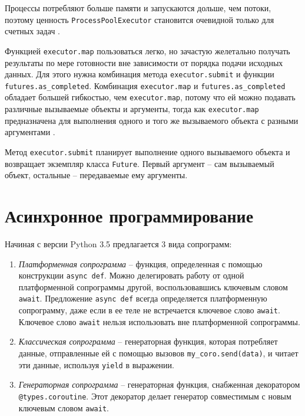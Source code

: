 \documentclass[%
	11pt,
	a4paper,
	utf8,
		]{article}
\begin{document}
Процессы потребляют больше памяти и запускаются дольше, чем потоки, поэтому ценность \verb|ProcessPoolExecutor| становится очевидной только для счетных задач \cite[]{ramalho:python-2022}.

Функцией \verb*|executor.map| пользоваться легко, но зачастую желетально получать результаты по мере готовности вне зависимости от порядка подачи исходных данных. Для этого нужна комбинация метода \verb|executor.submit| и функции \verb*|futures.as_completed|. Комбинация \verb|executor.map| и \verb*|futures.as_completed| обладает большей гибкостью, чем \verb|executor.map|, потому что ей можно подавать различные вызываемые объекты и аргументы, тогда как \verb*|executor.map| предназначена для выполнения одного и того же вызываемого объекта с разными аргументами \cite[]{ramalho:python-2022}.

Метод \verb|executor.submit| планирует выполнение одного вызываемого объекта и возвращает экземпляр класса \verb*|Future|. Первый аргумент -- сам вызываемый объект, остальные -- передаваемые ему аргументы.

\section{Асинхронное программирование}

Начиная с версии Python 3.5 предлагается 3 вида сопрограмм:
\begin{enumerate}
	\item \emph{Платформенная сопрограмма} -- функция, определенная с помощью конструкции \verb|async def|. Можно делегировать работу от одной платформенной сопрограммы другой, воспользовавшись ключевым словом \verb*|await|. Предложение \verb|async def| всегда определяется платформенную сопрограмму, даже если в ее теле не встречается ключевое слово \verb*|await|. Ключевое слово \verb|await| нельзя использовать вне платформенной сопрограммы.
	
	\item \emph{Классическая сопрограмма} -- генераторная функция, которая потребляет данные, отправленные ей с помощью вызовов \verb*|my_coro.send(data)|, и читает эти данные, используя \verb|yield| в выражении.
	
	\item \emph{Генераторная сопрограмма} -- генераторная функция, снабженная декоратором \verb*|@types.coroutine|. Этот декоратор делает генератор совместимым с новым ключевым словом \verb|await|.
\end{enumerate}
\end{document}
